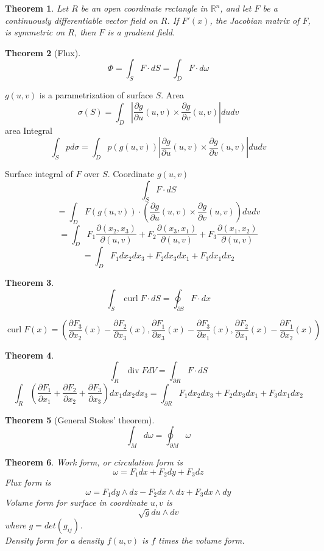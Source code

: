 \documentclass[letter]{article}
\newcommand{\R}{\mathbb{R}}
\newcommand{\curl}{\operatorname{curl}}
\newtheorem{theorem}{Theorem}[section]
\newenvironment{definition}[1][Definition]{\begin{trivlist}
\item[\hskip \labelsep {\bfseries #1}]}{\end{trivlist}}
\begin{document}
\begin{theorem}
Let $R$ be an open coordinate rectangle in $\R^n$, and let $F$ be a continuously differentiable vector field on $R$. If $F'(x)$, the Jacobian matrix of $F$, is symmetric on $R$, then $F$ is a gradient field.
\end{theorem}

\begin{theorem}[Flux]
\[
\Phi = \int_S F \cdot dS = \int_D F \cdot d\omega
\]
\end{theorem}

\begin{definition}
$g(u,v)$ is a parametrization of surface $S$.
Area
\[
\sigma(S) = \int_D |\frac{\partial g}{\partial u}(u,v) \times \frac{\partial g}{\partial v}(u,v)|du dv
\]
area Integral
\[
\int_S p d\sigma = \int_D p(g(u,v))|\frac{\partial g}{\partial u}(u,v) \times \frac{\partial g}{\partial v}(u,v)|du dv
\]
\end{definition}

\begin{definition}
Surface integral of $F$ over $S$. Coordinate $g(u,v)$
\[
\int_S F\cdot dS
\]
\[
=\int_D F(g(u,v))\cdot (\frac{\partial g}{\partial u}(u,v) \times \frac{\partial g}{\partial v}(u,v))du dv
\]
\[
=\int_D F_1 \frac{\partial(x_2,x_3)}{\partial(u,v)} +  F_2 \frac{\partial(x_3,x_1)}{\partial(u,v)}+ F_3 \frac{\partial(x_1,x_2)}{\partial(u,v)}
\]
\[
=\int_D F_1 dx_2 dx_3 + F_2 dx_3dx_1+F_3 dx_1 dx_2
\]
\end{definition}

\begin{theorem}
\[
\int_S \curl F\cdot dS = \oint_{\partial S} F\cdot dx
\]
\end{theorem}

\begin{definition}
\[
\curl F(x) = \left(\frac{\partial F_3}{\partial x_2}(x)-\frac{\partial F_2}{\partial x_3}(x),
\frac{\partial F_1}{\partial x_3}(x)-\frac{\partial F_3}{\partial x_1}(x),
\frac{\partial F_2}{\partial x_1}(x)-\frac{\partial F_1}{\partial x_2}(x)\right)
\]
\end{definition}

\begin{theorem}
\[
\int_R \operatorname{div} F dV = \int_{\partial R} F\cdot dS
\]
\[
\int_R (\frac{\partial F_1}{\partial x_1}+ \frac{\partial F_2}{\partial x_2}+ \frac{\partial F_3}{\partial x_3}) dx_1dx_2dx_3
= \int_{\partial R} F_1 dx_2 dx_3 + F_2 dx_3 dx_1 + F_3 dx_1 dx_2
\]
\end{theorem}

\begin{theorem}[General Stokes' theorem]
\[
\int_M d\omega = \oint_{\partial M} \omega
\]
\end{theorem}

\begin{theorem}
Work form, or circulation form is
\[
\omega = F_1 dx + F_2 dy + F_3 dz
\]
Flux form is
\[
\omega = F_1 dy\wedge dz - F_2 dx\wedge dz + F_3 dx\wedge dy
\]
Volume form for surface in coordinate $u,v$ is
\[
\sqrt{g} du\wedge dv
\]
where $g = det (g_{ij})$.\\
Density form for a density $f(u,v)$ is $f$ times the volume form.
\end{theorem}
\end{document}
